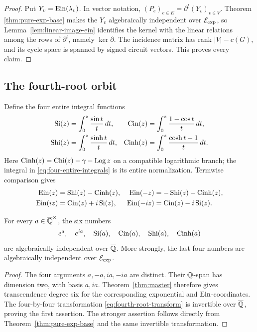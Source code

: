 \begin{proof}
Put \(Y_v=\operatorname{Ein}(\lambda_v)\).  In vector notation,
\((P_e)_{e\in E}=\partial^t(Y_v)_{v\in V}\).  Theorem
\ref{thm:pure-exp-base} makes the \(Y_v\) algebraically independent over
\(\mathcal E_{\mathrm{exp}}\), so Lemma~\ref{lem:linear-image-ein} identifies the kernel with
the linear relations among the rows of \(\partial^t\), namely
\(\ker\partial\).  The incidence matrix has rank \(|V|-c(G)\), and its
cycle space is spanned by signed circuit vectors.  This proves every claim.
\end{proof}

\subsection{The fourth-root orbit}

Define the four entire integral functions
\begin{equation}\label{eq:four-entire-integrals}
\begin{aligned}
 \operatorname{Si}(z)&=\int_0^z\frac{\sin t}{t}\,dt,&
 \operatorname{Cin}(z)&=\int_0^z\frac{1-\cos t}{t}\,dt,\\
 \operatorname{Shi}(z)&=\int_0^z\frac{\sinh t}{t}\,dt,&
 \operatorname{Cinh}(z)&=\int_0^z\frac{\cosh t-1}{t}\,dt.
\end{aligned}
\end{equation}
Here \(\operatorname{Cinh}(z)=\operatorname{Chi}(z)-\gamma-\operatorname{Log} z\) on a compatible logarithmic
branch; the integral in \eqref{eq:four-entire-integrals} is its entire
normalization.  Termwise comparison gives
\begin{equation}\label{eq:fourth-root-transform}
\begin{aligned}
 \operatorname{Ein}(z)&=\operatorname{Shi}(z)-\operatorname{Cinh}(z),&
 \operatorname{Ein}(-z)&=-\operatorname{Shi}(z)-\operatorname{Cinh}(z),\\
 \operatorname{Ein}(iz)&=\operatorname{Cin}(z)+i\operatorname{Si}(z),&
 \operatorname{Ein}(-iz)&=\operatorname{Cin}(z)-i\operatorname{Si}(z).
\end{aligned}
\end{equation}

\begin{theorem}\label{thm:fourth-root-orbit}
For every \(a\in\overline{\mathbb Q}^\times\), the six numbers
\begin{equation}\label{eq:six-orbit-values}
 e^a,\quad e^{ia},\quad
 \operatorname{Si}(a),\quad\operatorname{Cin}(a),\quad\operatorname{Shi}(a),\quad\operatorname{Cinh}(a)
\end{equation}
are algebraically independent over \(\overline{\mathbb Q}\).  More strongly, the last four
numbers are algebraically independent over \(\mathcal E_{\mathrm{exp}}\).
\end{theorem}

\begin{proof}
The four arguments \(a,-a,ia,-ia\) are distinct.  Their \(\mathbb Q\)-span has
dimension two, with basis \(a,ia\).  Theorem~\ref{thm:master} therefore
gives transcendence degree six for the corresponding exponential and
\(\operatorname{Ein}\)-coordinates.  The four-by-four transformation
\eqref{eq:fourth-root-transform} is invertible over \(\overline{\mathbb Q}\), proving the
first assertion.  The stronger assertion follows directly from
Theorem~\ref{thm:pure-exp-base} and the same invertible transformation.
\end{proof}

